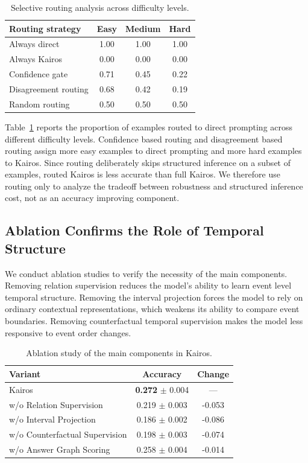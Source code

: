 \documentclass[11pt]{article}
\newcommand{\method}{Kairos}
\begin{document}
\begin{table}[t]
\centering
\footnotesize
\setlength{\tabcolsep}{4pt}
\renewcommand{\arraystretch}{1.08}
\caption{Selective routing analysis across difficulty levels.}
\label{tab:routing_analysis}
\begin{tabular}{l|ccc}
\toprule
\rowcolor{headgray}
Routing strategy & Easy & Medium & Hard \\
\midrule
Always direct & 1.00 & 1.00 & 1.00 \\
Always \method{} & 0.00 & 0.00 & 0.00 \\
Confidence gate & 0.71 & 0.45 & 0.22 \\
Disagreement routing & 0.68 & 0.42 & 0.19 \\
\rowcolor{rowred}
Random routing & 0.50 & 0.50 & 0.50 \\
\bottomrule
\end{tabular}
\end{table}

Table~\ref{tab:routing_analysis} reports the proportion of examples routed to direct prompting across different difficulty levels. Confidence based routing and disagreement based routing assign more easy examples to direct prompting and more hard examples to \method. Since routing deliberately skips structured inference on a subset of examples, routed \method{} is less accurate than full \method. We therefore use routing only to analyze the tradeoff between robustness and structured inference cost, not as an accuracy improving component.

\subsection{Ablation Confirms the Role of Temporal Structure}

We conduct ablation studies to verify the necessity of the main components. Removing relation supervision reduces the model's ability to learn event level temporal structure. Removing the interval projection forces the model to rely on ordinary contextual representations, which weakens its ability to compare event boundaries. Removing counterfactual temporal supervision makes the model less responsive to event order changes.

\begin{table}[t]
\centering
\footnotesize
\setlength{\tabcolsep}{4pt}
\renewcommand{\arraystretch}{1.08}
\caption{Ablation study of the main components in \method.}
\label{tab:ablation}
\begin{tabular}{l|cc}
\toprule
\rowcolor{headgray}
Variant & Accuracy & Change \\
\midrule
\rowcolor{rowred}
\method{} & \textbf{0.272} $\pm$ 0.004 & --- \\
w/o Relation Supervision & 0.219 $\pm$ 0.003 & -0.053 \\
w/o Interval Projection & 0.186 $\pm$ 0.002 & -0.086 \\
w/o Counterfactual Supervision & 0.198 $\pm$ 0.003 & -0.074 \\
w/o Answer Graph Scoring & 0.258 $\pm$ 0.004 & -0.014 \\
\bottomrule
\end{tabular}
\end{table}
\end{document}
